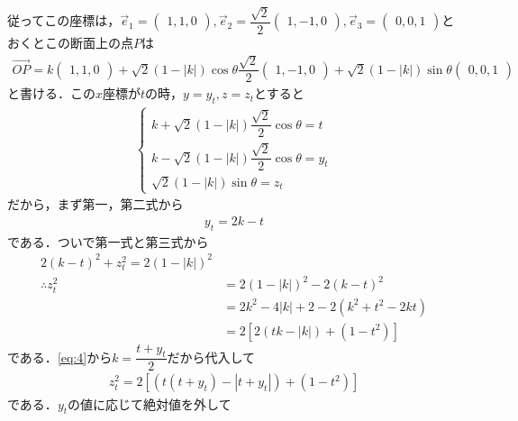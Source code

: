 \documentclass[../../main.tex]{subfiles}
\begin{document}
従ってこの座標は，$\vec{e}_1=
\begin{pmatrix} 1,1,0
\end{pmatrix}, \vec{e}_2=\dfrac{\sqrt{2}}{2}
\begin{pmatrix} 1,-1,0
\end{pmatrix}, \vec{e}_3=
\begin{pmatrix} 0,0,1
\end{pmatrix}$とおくとこの断面上の点$P$は
\begin{align}
  \overrightarrow{OP}
  = k
  \begin{pmatrix} 1,1,0
  \end{pmatrix}
  + \sqrt{2}(1-|k|) \cos\theta \dfrac{\sqrt{2}}{2}
  \begin{pmatrix} 1,-1,0
  \end{pmatrix}
  + \sqrt{2}(1-|k|) \sin\theta
  \begin{pmatrix} 0,0,1
  \end{pmatrix} \label{eq:3}
\end{align}
と書ける．この$x$座標が$t$の時，$y=y_t,z=z_t$とすると
\begin{align}
  \begin{cases}
    k + \sqrt{2}(1-|k|) \dfrac{\sqrt{2}}{2} \cos\theta = t \\
    k - \sqrt{2}(1-|k|) \dfrac{\sqrt{2}}{2} \cos\theta = y_t \\
    \sqrt{2}(1-|k|) \sin\theta = z_t
  \end{cases}
\end{align}
だから，まず第一，第二式から
\begin{align}
  y_t = 2k - t \label{eq:4}
\end{align}
である．ついで第一式と第三式から
\begin{align}
  2(k-t)^2 + z_t^2 = 2(1-|k|)^2 \\
  \therefore
  z_t^2
  & = 2(1-|k|)^2 - 2(k-t)^2 \\
  & = 2k^2 - 4|k|+2 - 2(k^2+t^2-2kt) \\
  & = 2\left[2(tk-|k|) + (1-t^2)\right] \label{eq:5}
\end{align}
である．\cref{eq:4}から$k=\dfrac{t+y_t}{2}$だから代入して
\begin{align}
  z_t^2 = 2\left[(t(t+y_t)-|t+y_t|) + (1-t^2)\right] \label{eq:6}
\end{align}
である．$y_t$の値に応じて絶対値を外して
\end{document}
